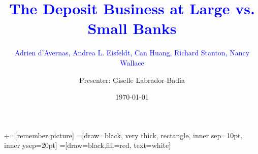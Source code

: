 \documentclass[notes,10pt, aspectratio=169]{beamer}
\title[]{\textcolor{blue}{The Deposit Business at Large vs. Small Banks}} %
\subtitle{\textcolor{blue}{Adrien d'Avernas, Andrea L. Eisfeldt, Can Huang, Richard Stanton, Nancy Wallace}}
\author{Presenter: Giselle Labrador-Badia}
\institute{University of Wisconsin-Madison}
\date{\today}
\begin{document}
\newcommand\marktopleft[1]{%
 \tikz[overlay,remember picture] 
 \node (marker-#1-a) at (-.3em,.3em) {};%
}
\newcommand\markbottomright[2]{%
 \tikz[overlay,remember picture] 
 \node (marker-#1-b) at (0em,0em) {};%
}
+=[remember picture] 
 =[draw=black, very thick, rectangle, inner sep=10pt, inner ysep=20pt]
 =[draw=black,fill=red, text=white]

\begin{frame}[noframenumbering]
 \maketitle
\end{frame}
\end{document}
